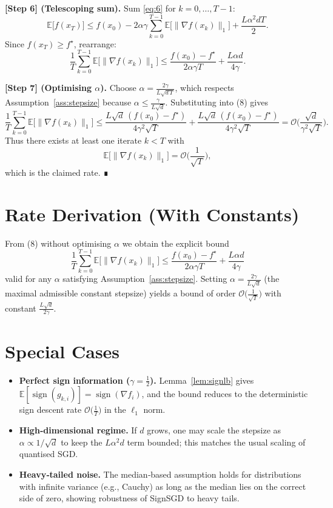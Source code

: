\documentclass[11pt]{article}
\newcommand{\sign}{\operatorname{sign}}
\newcommand{\EE}{\mathbb{E}}
\begin{document}
\bigskip
\noindent\textbf{[Step 6] (Telescoping sum).}  
Sum \eqref{eq:6} for $k=0,\dots,T-1$:
\[
\EE\!\big[f(x_{T})\big]\le f(x_{0})
-2\alpha\gamma\sum_{k=0}^{T-1}\EE\!\big[\|\nabla f(x_{k})\|_{1}\big]
+\frac{L\alpha^{2}dT}{2}.
\tag{7}
\]
Since $f(x_{T})\ge f^{\star}$, rearrange:
\[
\frac{1}{T}\sum_{k=0}^{T-1}\EE\!\big[\|\nabla f(x_{k})\|_{1}\big]
\le
\frac{f(x_{0})-f^{\star}}{2\alpha\gamma T}
+\frac{L\alpha d}{4\gamma}.
\tag{8}
\]

\bigskip
\noindent\textbf{[Step 7] (Optimising $\alpha$).}  
Choose $\alpha=\frac{2\gamma}{L\sqrt{d\,T}}$, which respects Assumption~\ref{ass:stepsize} because
$\alpha\le\frac{\gamma}{L\sqrt{d}}$. Substituting into (8) gives
\[
\frac{1}{T}\sum_{k=0}^{T-1}\EE\!\big[\|\nabla f(x_{k})\|_{1}\big]
\le
\frac{L\sqrt{d}\,(f(x_{0})-f^{\star})}{4\gamma^{2}\sqrt{T}}
+\frac{L\sqrt{d}\,(f(x_{0})-f^{\star})}{4\gamma^{2}\sqrt{T}}
= \mathcal O\!\Big(\frac{\sqrt{d}}{\gamma^{2}\sqrt{T}}\Big).
\]
Thus there exists at least one iterate $k<T$ with
\[
\EE\!\big[\|\nabla f(x_{k})\|_{1}\big]=\mathcal O\!\Big(\frac{1}{\sqrt{T}}\Big),
\]
which is the claimed rate. ∎

\section*{Rate Derivation (With Constants)}
From (8) without optimising $\alpha$ we obtain the explicit bound
\[
\boxed{
\frac{1}{T}\sum_{k=0}^{T-1}\EE\!\big[\|\nabla f(x_{k})\|_{1}\big]
\le
\frac{f(x_{0})-f^{\star}}{2\alpha\gamma T}
+\frac{L\alpha d}{4\gamma}
}
\]
valid for any $\alpha$ satisfying Assumption~\ref{ass:stepsize}.  
Setting $\alpha = \frac{2\gamma}{L\sqrt{d}}$ (the maximal admissible constant stepsize) yields a bound of order $\mathcal O\big(\frac{1}{\sqrt{T}}\big)$ with constant $\frac{L\sqrt{d}}{2\gamma}$.

\section*{Special Cases}
\begin{itemize}
\item \textbf{Perfect sign information ($\gamma=\tfrac12$).} Lemma~\ref{lem:signlb} gives $\EE[\sign(g_{k,i})]=\sign(\nabla f_{i})$, and the bound reduces to the deterministic sign descent rate $\mathcal O\big(\frac{1}{T}\big)$ in the $\ell_{1}$ norm.
\item \textbf{High‑dimensional regime.} If $d$ grows, one may scale the stepsize as $\alpha\propto 1/\sqrt{d}$ to keep the $L\alpha^{2}d$ term bounded; this matches the usual scaling of quantised SGD.
\item \textbf{Heavy‑tailed noise.} The median‑based assumption holds for distributions with infinite variance (e.g., Cauchy) as long as the median lies on the correct side of zero, showing robustness of SignSGD to heavy tails.
\end{itemize}
\end{document}
